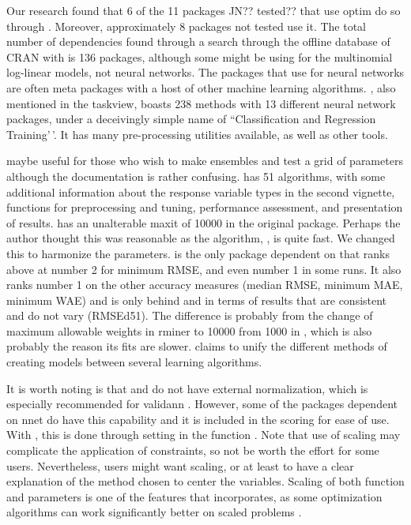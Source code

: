 Our research found that 6 of the 11 packages JN?? tested?? that use
optim do so through . Moreover, approximately 8 packages
not tested use it. The total number of  dependencies found
through a search through the offline database of CRAN with
 is 136 packages, although some might be using
 for the multinomial log-linear models, not neural
networks. The packages that use  for neural networks are
often meta packages with a host of other machine learning algorithms.
 \citep{R-caret}, also mentioned in the taskview, boasts
238 methods with 13 different neural network packages, under a
deceivingly simple name of ``Classification and Regression Training'\,'.
It has many pre-processing utilities available, as well as other tools.

 \citep{R-EnsembleBase} maybe useful for those who
wish to make ensembles and test a grid of parameters although the
documentation is rather confusing. 
\citep{R-MachineShop} has 51 algorithms, with some additional
information about the response variable types in the second vignette,
functions for preprocessing and tuning, performance assessment, and
presentation of results.  \citep{R-radiant.model}
has an unalterable maxit of 10000 in the original package. Perhaps the
author thought this was reasonable as the algorithm, , is
quite fast. We changed this to harmonize the parameters.
 \citep{R-rminer} is the only package dependent on
 that ranks above  at number 2 for minimum
RMSE, and even number 1 in some runs. It also ranks number 1 on the
other accuracy measures (median RMSE, minimum MAE, minimum WAE) and is
only behind  and  in terms of
results that are consistent and do not vary (RMSEd51). The difference is
probably from the change of maximum allowable weights in rminer to 10000
from 1000 in , which is also probably the reason its fits
are slower.  \citep{R-traineR} claims to unify the
different methods of creating models between several learning
algorithms.

It is worth noting is that  and  do not
have external normalization, which is especially recommended for
validann . However, some of the packages dependent on nnet do have this
capability and it is included in the scoring for ease of use. With
, this is done through setting  in
the function . Note that use of scaling may complicate
the application of constraints, so not be worth the effort for some
users. Nevertheless, users might want scaling, or at least to have a
clear explanation of the method chosen to center the variables. Scaling
of both function and parameters is one of the features that
 \citep{R-optimx} incorporates, as some optimization
algorithms can work significantly better on scaled problems
\citep{Nash-nlpor14}.

